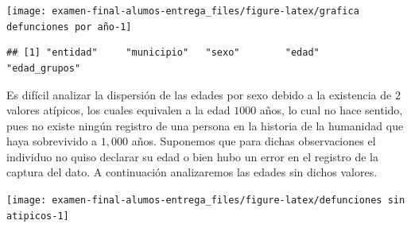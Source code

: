 \documentclass[
]{article}
\newenvironment{Shaded}{\begin{snugshade}}{\end{snugshade}}
\newcommand{\DataTypeTok}[1]{\textcolor[rgb]{0.13,0.29,0.53}{#1}}
\newcommand{\DecValTok}[1]{\textcolor[rgb]{0.00,0.00,0.81}{#1}}
\newcommand{\KeywordTok}[1]{\textcolor[rgb]{0.13,0.29,0.53}{\textbf{#1}}}
\newcommand{\NormalTok}[1]{#1}
\newcommand{\OperatorTok}[1]{\textcolor[rgb]{0.81,0.36,0.00}{\textbf{#1}}}
\newcommand{\StringTok}[1]{\textcolor[rgb]{0.31,0.60,0.02}{#1}}
\begin{document}
\begin{center}\texttt{[image: examen-final-alumos-entrega\_files/figure-latex/grafica defunciones por año-1]} \end{center}

\begin{Shaded}
\end{Shaded}

\begin{verbatim}
## [1] "entidad"     "municipio"   "sexo"        "edad"        "edad_grupos"
\end{verbatim}

Es difícil analizar la dispersión de las edades por sexo debido a la
existencia de \(2\) valores atípicos, los cuales equivalen a la edad
\(1000\) años, lo cual no hace sentido, pues no existe ningún registro
de una persona en la historia de la humanidad que haya sobrevivido a
\(1,000\) años. Suponemos que para dichas observaciones el individuo no
quiso declarar su edad o bien hubo un error en el registro de la captura
del dato. A continuación analizaremos las edades sin dichos valores.

\begin{Shaded}
\end{Shaded}

\begin{center}\texttt{[image: examen-final-alumos-entrega\_files/figure-latex/defunciones sin atipicos-1]} \end{center}
\end{document}
